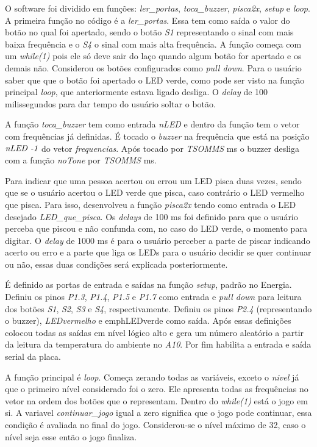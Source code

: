 \documentclass[conference]{IEEEtran}
\begin{document}
O software foi dividido em funções: \emph{ler\_portas}, \emph{toca\_buzzer}, \emph{pisca2x}, \emph{setup} e \emph{loop}. A primeira função no código é a \emph{ler\_portas}. Essa tem como saída o valor do botão no qual foi apertado, sendo o botão \emph{S1} representando o sinal com mais baixa frequência e o \emph{S4} o sinal com mais alta frequência. A função começa com um \emph{while(1)} pois ele só deve sair do laço quando algum botão for apertado e os demais não. Considerou os botões configurados como \emph{pull down}. Para o usuário saber que que o botão foi apertado o LED verde, como pode ser visto na função principal \emph{loop}, que anteriormente estava ligado desliga. O \emph{delay} de 100 milissegundos para dar tempo do usuário soltar o botão.

A função \emph{toca\_buzzer} tem como entrada \emph{nLED} e dentro da função tem o vetor com frequências já definidas. É tocado o \emph{buzzer} na frequência que está na posição $\emph{nLED -1}$ do vetor \emph{frequencias}. Após tocado por \emph{TSOMMS} ms o buzzer desliga com a função \emph{noTone} por \emph{TSOMMS} ms.

Para indicar que uma pessoa acertou ou errou um LED pisca duas vezes, sendo que se o usuário acertou o LED verde que pisca, caso contrário o LED vermelho que pisca. Para isso, desenvolveu a função \emph{pisca2x} tendo como entrada o LED desejado \emph{LED\_que\_pisca}. Os \emph{delays} de 100 ms foi definido para que o usuário perceba que piscou e não confunda com, no caso do LED verde, o momento para digitar. O \emph{delay} de 1000 ms é para o usuário perceber a parte de piscar indicando acerto ou erro e a parte que liga os LEDs para o usuário decidir se quer continuar ou não, essas duas condições será explicada posteriormente.

É definido as portas de entrada e saídas na função \emph{setup}, padrão no Energia. Definiu os pinos \emph{P1.3}, \emph{P1.4}, \emph{P1.5} e \emph{P1.7} como entrada e \emph{pull down} para leitura dos botões \emph{S1}, \emph{S2}, \emph{S3} e \emph{S4}, respectivamente. Definiu os pinos \emph{P2.4} (representando o buzzer), \emph{LEDvermelho} e emph{LEDverde} como saída. Após essas definições colocou todas as saídas em nível lógico alto e gera um número aleatório a partir da leitura da temperatura do ambiente no \emph{A10}. Por fim habilita a entrada e saída serial da placa.

A função principal é \emph{loop}. Começa zerando todas as variáveis, exceto o \emph{nivel} já que o primeiro nível considerado foi o zero. Ele apresenta todas as frequências no vetor na ordem dos botões que o representam. Dentro do \emph{while(1)} está o jogo em si. A variavel \emph{continuar\_jogo} igual a zero significa que o jogo pode continuar, essa condição é avaliada no final do jogo. Considerou-se o nível máximo de 32, caso o nível seja esse então o jogo finaliza.
\end{document}
